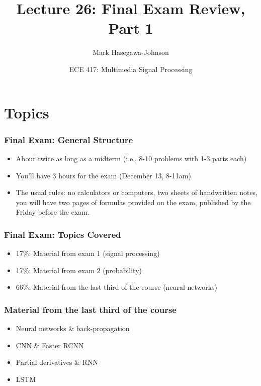 \documentclass{beamer}
\title{Lecture 26: Final Exam Review, Part 1}
\author{Mark Hasegawa-Johnson}
\date{ECE 417: Multimedia Signal Processing}
\institute{University of Illinois}
\begin{document}
\begin{frame}
  \maketitle
\end{frame}

\begin{frame}
  \tableofcontents
\end{frame}


\section{Topics}
\setcounter{subsection}{1}

\begin{frame}
  \frametitle{Final Exam: General Structure}

  \begin{itemize}
  \item About twice as long as a midterm (i.e., 8-10 problems with 1-3 parts each)
  \item You'll have 3 hours for the exam (December 13, 8-11am)
  \item The usual rules: no calculators or computers, two sheets of
    handwritten notes, you will have two pages of formulas provided on
    the exam, published by the Friday before the exam.  
  \end{itemize}
\end{frame}

\begin{frame}
  \frametitle{Final Exam: Topics Covered}

  \begin{itemize}
  \item 17\%: Material from exam 1 (signal processing)
  \item 17\%: Material from exam 2 (probability)
  \item 66\%: Material from the last third of the course (neural networks)
  \end{itemize}
\end{frame}

\begin{frame}
  \frametitle{Material from the last third of the course}

  \begin{itemize}
  \item Neural networks \& back-propagation
  \item CNN \& Faster RCNN
  \item Partial derivatives \& RNN
  \item LSTM
  \end{itemize}
\end{frame}
\end{document}
